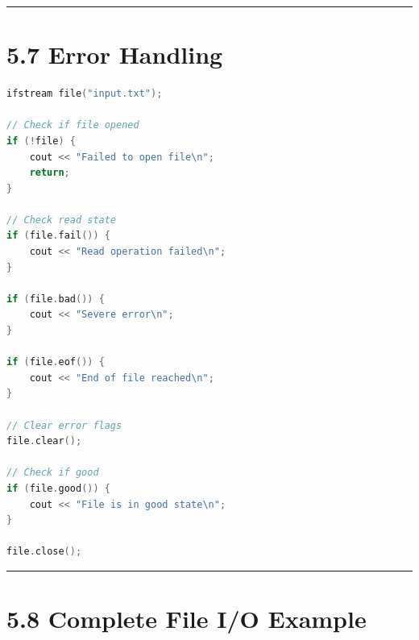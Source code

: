 \begin{center}\rule{0.5\linewidth}{0.5pt}\end{center}

\hypertarget{error-handling}{%
\section{5.7 Error Handling}\label{error-handling}}

\begin{lstlisting}[language={C++}]
ifstream file("input.txt");

// Check if file opened
if (!file) {
    cout << "Failed to open file\n";
    return;
}

// Check read state
if (file.fail()) {
    cout << "Read operation failed\n";
}

if (file.bad()) {
    cout << "Severe error\n";
}

if (file.eof()) {
    cout << "End of file reached\n";
}

// Clear error flags
file.clear();

// Check if good
if (file.good()) {
    cout << "File is in good state\n";
}

file.close();
\end{lstlisting}

\begin{center}\rule{0.5\linewidth}{0.5pt}\end{center}

\hypertarget{complete-file-io-example}{%
\section{5.8 Complete File I/O Example}\label{complete-file-io-example}}

